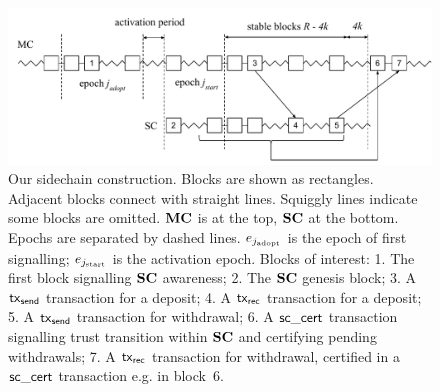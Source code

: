 \begin{figure}[tb]%
  \centering
  \includegraphics[width=\textwidth]{chapters/sidechains/figures/sidechains-overview.pdf}
  \caption{
  Our sidechain construction. Blocks are shown as rectangles. Adjacent blocks
  connect with straight lines. Squiggly lines indicate some blocks are omitted.
  $\mathbf{MC}$ is at the top, $\mathbf{SC}$ at the bottom. Epochs are separated by dashed
  lines. $e_{j_\text{adopt}}$ is the epoch of first signalling;
  $e_{j_\text{start}}$ is the activation epoch. Blocks of interest: 1. The
  first block signalling $\mathbf{SC}$ awareness;
  2. The $\mathbf{SC}$ genesis block; 3. A $\mathsf{tx}_{\mathsf{send}}$
  transaction for a deposit; 4. A $\mathsf{tx}_{\mathsf{rec}}$ transaction for a
  deposit; 5. A $\mathsf{tx}_{\mathsf{send}}$ transaction for withdrawal; 6. A $\mathsf{sc\_cert}$
  transaction signalling trust transition within $\mathbf{SC}$ and certifying pending
  withdrawals; 7. A $\mathsf{tx}_{\mathsf{rec}}$ transaction for withdrawal, certified in a $\mathsf{sc\_cert}$
  transaction e.g. in block~6.
  }
  \label{fig:sidechain}
\end{figure}%

